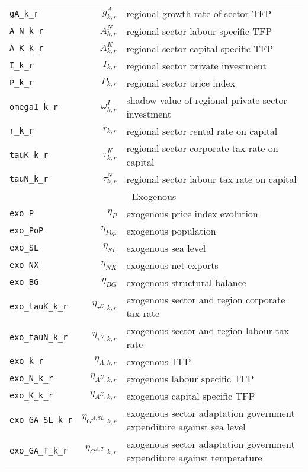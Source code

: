 \begin{center}
\begin{longtable}{lrl}
\texttt{gA\_k\_r} & ${g^{A}_{k,r}}$ & regional growth rate of sector TFP\\
\texttt{A\_N\_k\_r} & ${A^{N}_{k,r}}$ & regional sector labour specific TFP\\
\texttt{A\_K\_k\_r} & ${A^{K}_{k,r}}$ & regional sector capital specific TFP\\
\texttt{I\_k\_r} & ${I_{k,r}}$ & regional sector private investment\\
\texttt{P\_k\_r} & ${P_{k,r}}$ & regional sector price index\\
\texttt{omegaI\_k\_r} & ${\omega^I_{k,r}}$ & shadow value of regional private sector investment\\
\texttt{r\_k\_r} & ${r_{k,r}}$ & regional sector rental rate on capital\\
\texttt{tauK\_k\_r} & ${\tau^{K}_{k,r}}$ & regional sector corporate tax rate on capital\\
\texttt{tauN\_k\_r} & ${\tau^{N}_{k,r}}$ & regional sector labour tax rate on capital\\
\hline
\multicolumn{3}{c}{Exogenous}\\%
\hline
\texttt{exo\_P} & ${\eta_{P}}$ & exogenous price index evolution\\
\texttt{exo\_PoP} & ${\eta_{Pop}}$ & exogenous population\\
\texttt{exo\_SL} & ${\eta_{SL}}$ & exogenous sea level\\
\texttt{exo\_NX} & ${\eta_{NX}}$ & exogenous net exports\\
\texttt{exo\_BG} & ${\eta_{BG}}$ & exogenous structural balance\\
\texttt{exo\_tauK\_k\_r} & ${\eta_{\tau^{K},k,r}}$ & exogenous sector and region corporate tax rate\\
\texttt{exo\_tauN\_k\_r} & ${\eta_{\tau^{N},k,r}}$ & exogenous sector and region labour tax rate\\
\texttt{exo\_k\_r} & ${\eta_{A,k,r}}$ & exogenous TFP\\
\texttt{exo\_N\_k\_r} & ${\eta_{A^{N},k,r}}$ & exogenous labour specific TFP\\
\texttt{exo\_K\_k\_r} & ${\eta_{A^{K},k,r}}$ & exogenous capital specific TFP\\
\texttt{exo\_GA\_SL\_k\_r} & ${\eta_{G^{A,SL},k,r}}$ & exogenous sector adaptation government expenditure against sea level\\
\texttt{exo\_GA\_T\_k\_r} & ${\eta_{G^{A,T},k,r}}$ & exogenous sector adaptation government expenditure against temperature\\

\end{longtable}
\end{center}
